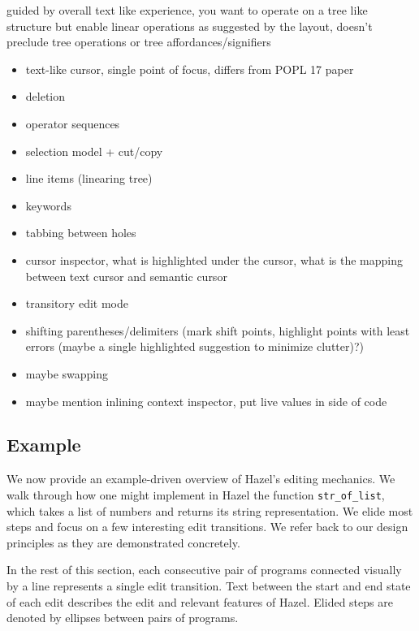 \documentclass[runningheads]{llncs}
\newcommand{\Hazel}{\textsf{Hazel}\xspace}
\begin{document}
guided by overall text like experience, you want to operate on a tree like structure but enable linear operations as suggested by the layout, doesn't preclude tree operations or tree affordances/signifiers
\begin{itemize}
\item text-like cursor, single point of focus, differs from POPL 17 paper
\item deletion
\item operator sequences
\item selection model + cut/copy
\item line items (linearing tree)
\item keywords
\item tabbing between holes
\item cursor inspector, what is highlighted under the cursor, what is the mapping between text cursor and semantic cursor
\item transitory edit mode
\item shifting parentheses/delimiters (mark shift points, highlight points with least errors (maybe a single highlighted suggestion to minimize clutter)?)
\item maybe swapping
\item maybe mention inlining context inspector, put live values in side of code
\end{itemize}




\subsection{Example}

We now provide an example-driven overview of \Hazel's editing mechanics.
We walk through how one might implement in \Hazel the function \texttt{str\_of\_list},
which takes a list of numbers and returns its string representation. We
elide most steps and focus on a few interesting edit transitions. We refer
back to our design principles as they are demonstrated concretely.

In the rest of this section, each consecutive pair of programs connected
visually by a line represents a single edit transition. Text between the
start and end state of each edit describes the edit and relevant features of
\Hazel. Elided steps are denoted by ellipses between pairs of programs.
\end{document}
